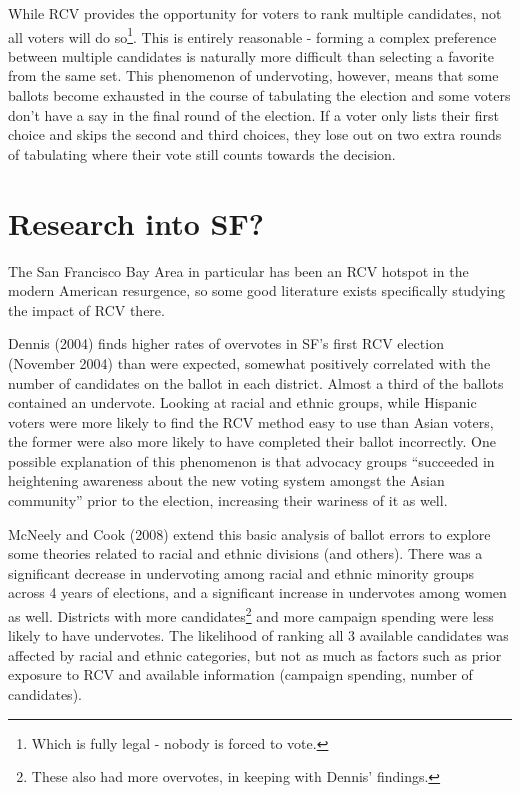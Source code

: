 \documentclass[12pt,twoside]{reedthesis}
\theoremstyle{definition}
\theoremstyle{definition}
\theoremstyle{definition}
\theoremstyle{remark}
\begin{document}
While RCV provides the opportunity for voters to rank multiple
candidates, not all voters will do so\footnote{Which is fully legal -
  nobody is forced to vote.}. This is entirely reasonable - forming a
complex preference between multiple candidates is naturally more
difficult than selecting a favorite from the same set. This phenomenon
of undervoting, however, means that some ballots become exhausted in the
course of tabulating the election and some voters don't have a say in
the final round of the election. If a voter only lists their first
choice and skips the second and third choices, they lose out on two
extra rounds of tabulating where their vote still counts towards the
decision.

\hypertarget{research-into-sf}{%
\section{Research into SF?}\label{research-into-sf}}

The San Francisco Bay Area in particular has been an RCV hotspot in the
modern American resurgence, so some good literature exists specifically
studying the impact of RCV there.

Dennis (2004) finds higher rates of overvotes in SF's first RCV election
(November 2004) than were expected, somewhat positively correlated with
the number of candidates on the ballot in each district. Almost a third
of the ballots contained an undervote. Looking at racial and ethnic
groups, while Hispanic voters were more likely to find the RCV method
easy to use than Asian voters, the former were also more likely to have
completed their ballot incorrectly. One possible explanation of this
phenomenon is that advocacy groups ``succeeded in heightening awareness
about the new voting system amongst the Asian community'' prior to the
election, increasing their wariness of it as well.

McNeely and Cook (2008) extend this basic analysis of ballot errors to
explore some theories related to racial and ethnic divisions (and
others). There was a significant decrease in undervoting among racial
and ethnic minority groups across 4 years of elections, and a
significant increase in undervotes among women as well. Districts with
more candidates\footnote{These also had more overvotes, in keeping with
  Dennis' findings.} and more campaign spending were less likely to have
undervotes. The likelihood of ranking all 3 available candidates was
affected by racial and ethnic categories, but not as much as factors
such as prior exposure to RCV and available information (campaign
spending, number of candidates).
\end{document}
